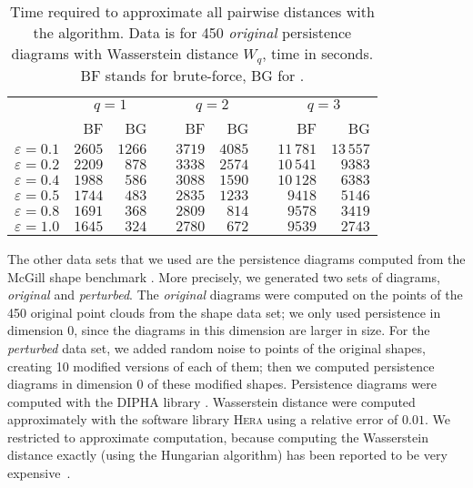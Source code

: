 \documentclass{ws-ijcga}
\newcommand{\eps}{\varepsilon}
\newcommand{\dtype}[1]{{\textit{\small #1}}}
\newcommand{\libraryname}[1]{{\textsc{#1}}\xspace}
\newcommand{\hera}{\libraryname{Hera}}
\begin{document}
\begin{table}\centering
    \begin{tabular}{@{}rrrcrrcrr@{}}\toprule
                          & \multicolumn{2}{c}{$q=1$} & \phantom{c} & \multicolumn{2}{c}{$q=2$} & \phantom{c} & \multicolumn{2}{c}{$q=3$}\\
                          \cmidrule{2-3} \cmidrule{5-6} \cmidrule{8-9}
                          & BF & BG && BF & BG && BF & BG \\ \midrule
$\eps = 0.1$    &   $2605$  &  $1266$  &&  $3719$  &  $4085$  &&  $11\,781$  &  $13\,557$\\
$\eps = 0.2$    &   $2209$  &  $878$  &&  $3338$  &  $2574$  &&  $10\,541$  &  $9383$ \\
$\eps = 0.4$    &   $1988$  &  $586$  &&  $3088$  &  $1590$  &&  $10\,128$    &  $6383$ \\
$\eps = 0.5$    &   $1744$  &  $483$  &&  $2835$  &  $1233$  &&  $9418$    &  $5146$ \\
$\eps = 0.8$    &   $1691$  &  $368$  &&  $2809$  &  $814$  &&  $9578$    &  $3419$ \\
$\eps = 1.0$    &   $1645$  &  $324$  &&  $2780$  &  $672$  &&  $9539$    &  $2743$ \\
\bottomrule
\end{tabular}
    \caption{Time required to approximate all pairwise distances with the \bgrdy algorithm.
    Data is for 450 \dtype{original} persistence diagrams with Wasserstein distance $W_q$, time in seconds.
    BF stands for brute-force, BG for \bgrdy.}
\label{tbl:mcgill_original_blind_greedy_spanner_timing}
\end{table}



The other data sets that we used
are the persistence diagrams
computed from the McGill shape benchmark \cite{zhang2005mcgill}.
More precisely, we generated two sets of diagrams,
\dtype{original} and \dtype{perturbed}. The \dtype{original}
diagrams were computed on the points of the 450 original
point clouds from the shape data set; we only used
persistence in dimension 0, since the diagrams in this dimension are larger in size.
For the \dtype{perturbed} data set,
we added random noise to points of the original shapes,
creating 10 modified versions of each of them;
then we computed persistence diagrams in dimension 0 of these modified
shapes.
Persistence diagrams were computed with the \libraryname{DIPHA}
library \cite{bauer2014distributed}. 
Wasserstein distance were computed approximately
with the software library \hera using a relative error of $0.01$.
We restricted to approximate computation, because computing the
Wasserstein distance exactly (using the Hungarian algorithm)
has been reported to be very expensive~\cite{kerber2017geometry}.
\end{document}
